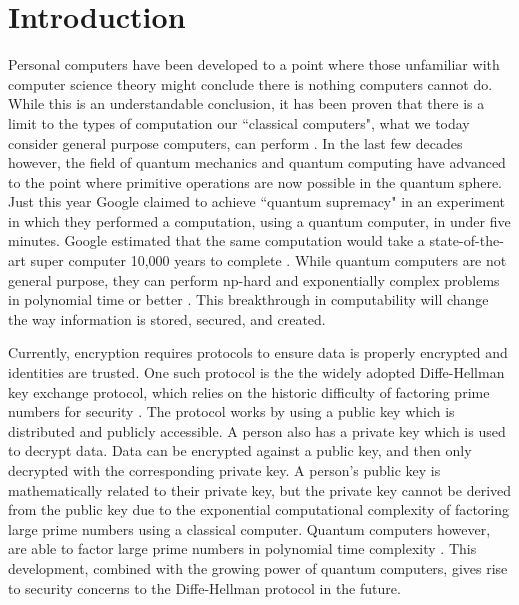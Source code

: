 \chapter{Introduction}
\label{chap:introduction}

Personal computers have been developed to a point where those unfamiliar with computer science theory might conclude there is nothing computers cannot do.
While this is an understandable conclusion, it has been proven that there is a limit to the types of computation our ``classical computers", what we today consider general purpose computers, can perform \cite{linz}.
In the last few decades however, the field of quantum mechanics and quantum computing have advanced to the point where primitive operations are now possible in the quantum sphere.
Just this year Google claimed to achieve ``quantum supremacy" in an experiment in which they performed a computation, using a quantum computer, in under five minutes. 
Google estimated that the same computation would take a state-of-the-art super computer 10,000 years to complete \cite{quantum_supremacy}. 
While quantum computers are not general purpose, they can perform np-hard and exponentially complex problems in polynomial time or better \cite{TODO}.
This breakthrough in computability will change the way information is stored, secured, and created.


Currently, encryption requires protocols to ensure data is properly encrypted and identities are trusted.
One such protocol is the the widely adopted Diffe-Hellman key exchange protocol, which relies on the historic difficulty of factoring prime numbers for security \cite{qc:agi}.
The protocol works by using a public key which is distributed and publicly accessible.
A person also has a private key which is used to decrypt data.
Data can be encrypted against a public key, and then only decrypted with the corresponding private key.
A person's public key is mathematically related to their private key, but the private key cannot be derived from the public key due to the exponential computational complexity of factoring large prime numbers using a classical computer.
Quantum computers however, are able to factor large prime numbers in polynomial time complexity \cite{doi:10.1137/S0036144598347011}.
This development, combined with the growing power of quantum computers, gives rise to security concerns to the Diffe-Hellman protocol in the future.

